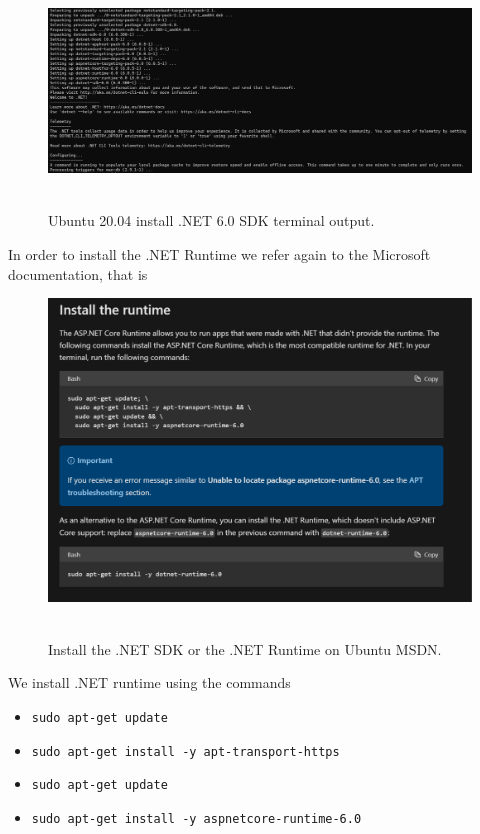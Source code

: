 \begin{figure}[H]
    \centering
    \includegraphics[width=1\textwidth]{img/03_4_sdk_install_3}
    ~\caption{Ubuntu 20.04 install .NET 6.0 SDK terminal output.}\label{fig:figure6}
\end{figure}

In order to install the .NET Runtime we refer again to the Microsoft documentation, that is
\begin{figure}[H]
    \centering
    \includegraphics[width=1\textwidth]{img/03_2_runtime_documentation}
    ~\caption{Install the .NET SDK or the .NET Runtime on Ubuntu MSDN.}\label{fig:figure7}
\end{figure}
We install .NET runtime using the commands
\begin{itemize}
    \item \texttt{sudo apt-get update}
    \item \texttt{sudo apt-get install -y apt-transport-https}
    \item \texttt{sudo apt-get update}
    \item \texttt{sudo apt-get install -y aspnetcore-runtime-6.0}
\end{itemize}
